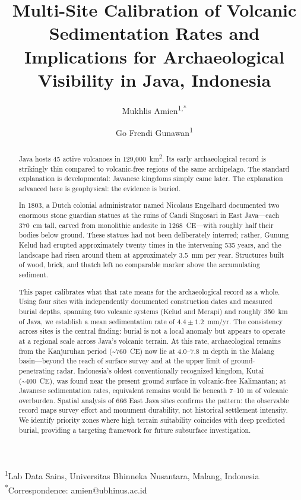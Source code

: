 \documentclass[12pt,a4paper]{article}
\begin{document}
\title{Multi-Site Calibration of Volcanic Sedimentation Rates and Implications for Archaeological Visibility in Java, Indonesia}

\author{Mukhlis Amien\textsuperscript{1,*} \and Go Frendi Gunawan\textsuperscript{1}}

\date{}

\maketitle

\noindent\textsuperscript{1}Lab Data Sains, Universitas Bhinneka Nusantara, Malang, Indonesia\\
\textsuperscript{*}Correspondence: amien@ubhinus.ac.id

\begin{abstract}
Java hosts 45 active volcanoes in 129,000~km\textsuperscript{2}. Its early archaeological record is strikingly thin compared to volcanic-free regions of the same archipelago. The standard explanation is developmental: Javanese kingdoms simply came later. The explanation advanced here is geophysical: the evidence is buried.

In 1803, a Dutch colonial administrator named Nicolaus Engelhard documented two enormous stone guardian statues at the ruins of Candi Singosari in East Java---each 370~cm tall, carved from monolithic andesite in 1268~CE---with roughly half their bodies below ground. These statues had not been deliberately interred; rather, Gunung Kelud had erupted approximately twenty times in the intervening 535 years, and the landscape had risen around them at approximately 3.5~mm per year. Structures built of wood, brick, and thatch left no comparable marker above the accumulating sediment.

This paper calibrates what that rate means for the archaeological record as a whole. Using four sites with independently documented construction dates and measured burial depths, spanning two volcanic systems (Kelud and Merapi) and roughly 350~km of Java, we establish a mean sedimentation rate of $4.4 \pm 1.2$~mm/yr. The consistency across sites is the central finding: burial is not a local anomaly but appears to operate at a regional scale across Java's volcanic terrain. At this rate, archaeological remains from the Kanjuruhan period (\textasciitilde760~CE) now lie at 4.0--7.8~m depth in the Malang basin---beyond the reach of surface survey and at the upper limit of ground-penetrating radar. Indonesia's oldest conventionally recognized kingdom, Kutai (\textasciitilde400~CE), was found near the present ground surface in volcanic-free Kalimantan; at Javanese sedimentation rates, equivalent remains would lie beneath 7--10~m of volcanic overburden. Spatial analysis of 666 East Java sites confirms the pattern: the observable record maps survey effort and monument durability, not historical settlement intensity. We identify priority zones where high terrain suitability coincides with deep predicted burial, providing a targeting framework for future subsurface investigation.


\end{abstract}
\end{document}
